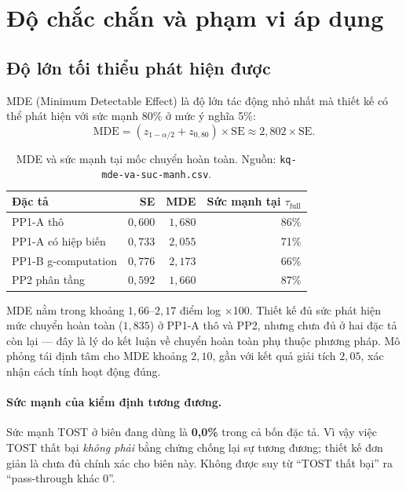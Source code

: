 \documentclass[11pt]{article}
\newcommand{\dvi}{điểm log $\times$100}
\begin{document}
\section{Độ chắc chắn và phạm vi áp dụng}

\subsection{Độ lớn tối thiểu phát hiện được}

MDE (Minimum Detectable Effect) là độ lớn tác động nhỏ nhất mà thiết kế có thể phát hiện với sức
mạnh 80\% ở mức ý nghĩa 5\%:
\begin{equation}
  \mathrm{MDE} = \left(z_{1-\alpha/2} + z_{0{,}80}\right) \times \mathrm{SE}
               \approx 2{,}802 \times \mathrm{SE}.
  \label{eq:mde}
\end{equation}

\begin{table}[htbp]
  \centering
  \caption{MDE và sức mạnh tại mốc chuyển hoàn toàn. Nguồn: \texttt{kq-mde-va-suc-manh.csv}.}
  \label{tab:mde}
  \begin{tabular}{lrrr}
    \toprule
    Đặc tả & SE & MDE & Sức mạnh tại $\tau_{\text{full}}$ \\
    \midrule
    PP1-A thô           & $0{,}600$ & $1{,}680$ & 86\% \\
    PP1-A có hiệp biến  & $0{,}733$ & $2{,}055$ & 71\% \\
    PP1-B g-computation & $0{,}776$ & $2{,}173$ & 66\% \\
    PP2 phân tầng       & $0{,}592$ & $1{,}660$ & 87\% \\
    \bottomrule
  \end{tabular}
\end{table}

MDE nằm trong khoảng $1{,}66$--$2{,}17$ \dvi{}. Thiết kế đủ sức phát hiện mức chuyển hoàn toàn
($1{,}835$) ở PP1-A thô và PP2, nhưng chưa đủ ở hai đặc tả còn lại --- đây là lý do kết luận về
chuyển hoàn toàn phụ thuộc phương pháp. Mô phỏng tái định tâm cho MDE khoảng $2{,}10$, gần với kết
quả giải tích $2{,}05$, xác nhận cách tính hoạt động đúng.

\paragraph{Sức mạnh của kiểm định tương đương.} Sức mạnh TOST ở biên đang dùng là \textbf{0,0\%}
trong cả bốn đặc tả. Vì vậy việc TOST thất bại \emph{không phải} bằng chứng chống lại sự tương
đương; thiết kế đơn giản là chưa đủ chính xác cho biên này. Không được suy từ ``TOST thất bại'' ra
``pass-through khác 0''.
\end{document}
